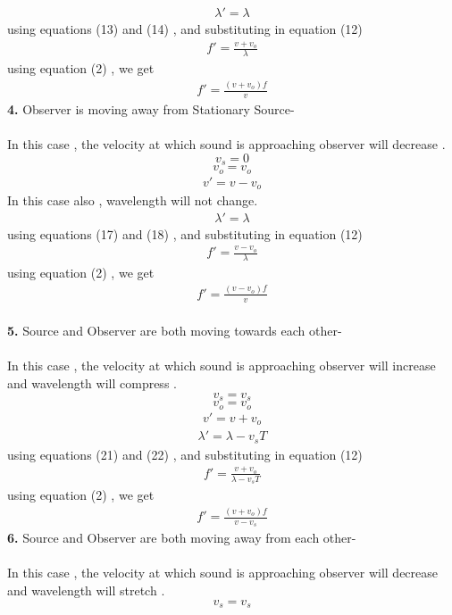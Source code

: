 \documentclass[journal,12pt,twocolumn]{IEEEtran}
\theoremstyle{remark}
\begin{document}
\begin{align}\lambda' = \lambda\end{align}
using equations (13) and (14) , and substituting in equation (12) 
\begin{align}f' = \frac{v+v_o}{\lambda}\end{align}
using equation (2) , we get 
\begin{align}f' = \frac{(v+v_o) f}{v }\end{align}
\textbf{4.} Observer is moving away from Stationary Source-\\\\
In this case , the velocity at which sound is approaching observer will decrease .
$$v_s = 0$$
$$v_o = v_o$$
\begin{align}v'= v-v_o\end{align}
In this case also , wavelength will not change.
\begin{align}\lambda' = \lambda\end{align}
using equations (17) and (18) , and substituting in equation (12) 
\begin{align}f' = \frac{v-v_o}{\lambda}\end{align}
using equation (2) , we get 
\begin{align}f' = \frac{(v-v_o) f}{v }\end{align}\\
\textbf{5.} Source and Observer are both moving towards each other-\\\\
In this case , the velocity at which sound is approaching observer will increase and wavelength will compress .
$$v_s = v_s$$
$$v_o = v_o$$
\begin{align}v'= v+v_o\end{align}
\begin{align}\lambda' = \lambda - v_s T\end{align}
using equations (21) and (22) , and substituting in equation (12) 
\begin{align}f' = \frac{v+v_o}{\lambda-v_s T}\end{align}
using equation (2) , we get 
\begin{align}f' = \frac{(v+v_o) f}{v-v_s }\end{align}
\textbf{6.} Source and Observer are both moving away from each other-\\\\
In this case , the velocity at which sound is approaching observer will decrease and wavelength will stretch .
$$v_s = v_s$$
\end{document}
